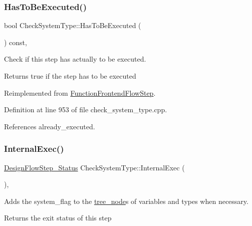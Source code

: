 \subsubsection{\texorpdfstring{Has\+To\+Be\+Executed()}{HasToBeExecuted()}}
{\footnotesize\ttfamily bool Check\+System\+Type\+::\+Has\+To\+Be\+Executed (\begin{DoxyParamCaption}{ }\end{DoxyParamCaption}) const\hspace{0.3cm}{\ttfamily [override]}, {\ttfamily [virtual]}}



Check if this step has actually to be executed. 

\begin{DoxyReturn}{Returns}
true if the step has to be executed 
\end{DoxyReturn}


Reimplemented from \hyperlink{classFunctionFrontendFlowStep_a12e786363530aa9533e4bd9380130d75}{Function\+Frontend\+Flow\+Step}.



Definition at line 953 of file check\+\_\+system\+\_\+type.\+cpp.



References already\+\_\+executed.

\mbox{\label{classCheckSystemType_ae3324caec3c8b0a2bc347b773670458f}} 
\subsubsection{\texorpdfstring{Internal\+Exec()}{InternalExec()}}
{\footnotesize\ttfamily \hyperlink{design__flow__step_8hpp_afb1f0d73069c26076b8d31dbc8ebecdf}{Design\+Flow\+Step\+\_\+\+Status} Check\+System\+Type\+::\+Internal\+Exec (\begin{DoxyParamCaption}{ }\end{DoxyParamCaption})\hspace{0.3cm}{\ttfamily [override]}, {\ttfamily [virtual]}}



Adds the system\+\_\+flag to the \hyperlink{classtree__node}{tree\+\_\+node}\textquotesingle{}s of variables and types when necessary. 

\begin{DoxyReturn}{Returns}
the exit status of this step 
\end{DoxyReturn}


